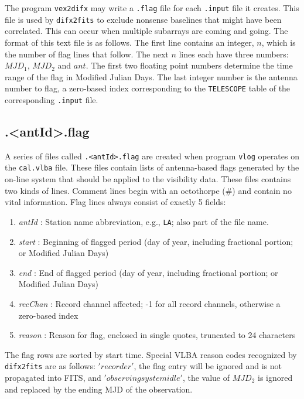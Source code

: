 The program {\tt vex2difx} may write a {\tt .flag} file for each {\tt .input} file it creates.
This file is used by {\tt difx2fits} to exclude nonsense baselines that might have been correlated.
This can occur when multiple subarrays are coming and going.
The format of this text file is as follows.
The first line contains an integer, $n$, which is the number of flag lines that follow.
The next $n$ lines each have three numbers: $MJD_1$, $MJD_2$ and $ant$.
The first two floating point numbers determine the time range of the flag in Modified Julian Days.
The last integer number is the antenna number to flag, a zero-based index corresponding to the {\tt TELESCOPE} table of the corresponding {\tt .input} file.



\subsection{.{\textless}antId{\textgreater}.flag} \label{sec:dotantflag}

A series of files called {\tt .{\textless}antId{\textgreater}.flag} are created when program {\tt vlog} operates on the {\tt cal.vlba} file.
These files contain lists of antenna-based flags generated by the on-line system that should be applied to the visibility data.
These files contains two kinds of lines.
Comment lines begin with an octothorpe (\#) and contain no vital information.
Flag lines always consist of exactly 5 fields:
\begin{enumerate}
\item {\em antId} : Station name abbreviation, e.g., {\tt LA}; also part of the file name.
\item {\em start} : Beginning of flagged period (day of year, including fractional portion; or Modified Julian Days)
\item {\em end} : End of flagged period (day of year, including fractional portion; or Modified Julian Days)
\item {\em recChan} : Record channel affected; -1 for all record channels, otherwise a zero-based index
\item {\em reason} : Reason for flag, enclosed in single quotes, truncated to 24 characters
\end{enumerate}
The flag rows are sorted by start time.
Special VLBA reason codes recognized by {\tt difx2fits} are as follows: $'recorder'$, the flag entry will be ignored and is not propagated into FITS, and $'observing system idle'$, the value of $MJD_2$ is ignored and replaced by the ending MJD of the observation.


